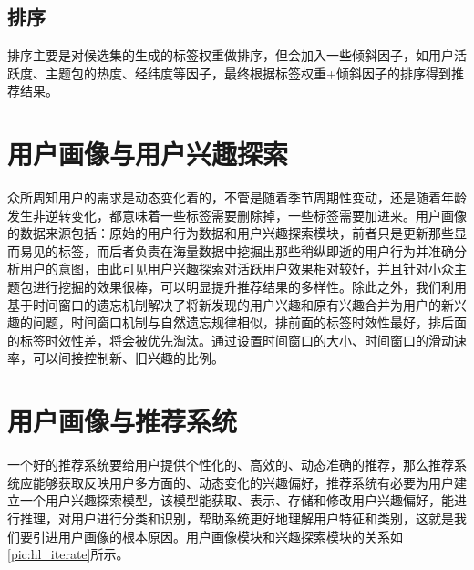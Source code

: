     \subsection{排序}
    排序主要是对候选集的生成的标签权重做排序，但会加入一些倾斜因子，如用户活跃度、主题包的热度、经纬度等因子，最终根据标签权重+倾斜因子的排序得到推荐结果。

  \section{用户画像与用户兴趣探索}
  众所周知用户的需求是动态变化着的，不管是随着季节周期性变动，还是随着年龄发生非逆转变化，都意味着一些标签需要删除掉，一些标签需要加进来。用户画像的数据来源包括：原始的用户行为数据和用户兴趣探索模块，前者只是更新那些显而易见的标签，而后者负责在海量数据中挖掘出那些稍纵即逝的用户行为并准确分析用户的意图，由此可见用户兴趣探索对活跃用户效果相对较好，并且针对小众主题包进行挖掘的效果很棒，可以明显提升推荐结果的多样性。除此之外，我们利用基于时间窗口的遗忘机制解决了将新发现的用户兴趣和原有兴趣合并为用户的新兴趣的问题，时间窗口机制与自然遗忘规律相似，排前面的标签时效性最好，排后面的标签时效性差，将会被优先淘汰。通过设置时间窗口的大小、时间窗口的滑动速率，可以间接控制新、旧兴趣的比例。

  \section{用户画像与推荐系统}
  一个好的推荐系统要给用户提供个性化的、高效的、动态准确的推荐，那么推荐系统应能够获取反映用户多方面的、动态变化的兴趣偏好，推荐系统有必要为用户建立一个用户兴趣探索模型，该模型能获取、表示、存储和修改用户兴趣偏好，能进行推理，对用户进行分类和识别，帮助系统更好地理解用户特征和类别，这就是我们要引进用户画像的根本原因。用户画像模块和兴趣探索模块的关系如\autoref{pic:hl_iterate}所示。
  \begin{figure}
    \centering
      \label{pic:hl_iterate}
  \end{figure}

